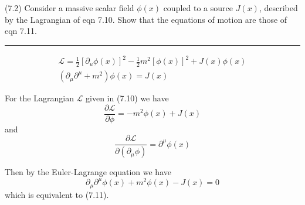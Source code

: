 \documentclass[12pt]{article}
\begin{document}
(7.2)
Consider a massive scalar field $\phi(x)$ coupled to
a source $J(x)$, described by the Lagrangian of
eqn 7.10. Show that the equations of motion are
those of eqn 7.11.

\bigskip
\hrule

\bigskip
\begin{gather*}
\mathcal L=\frac{1}{2}[\partial_u\phi(x)]^2-\frac{1}{2}m^2[\phi(x)]^2
+J(x)\phi(x)
\tag{7.10}
\\
(\partial_\mu\partial^\mu+m^2)\phi(x)=J(x)
\tag{7.11}
\end{gather*}

For the Lagrangian $\mathcal L$ given in (7.10) we have
\begin{equation*}
\frac{\partial\mathcal L}{\partial\phi}=-m^2\phi(x)+J(x)
\end{equation*}
and
\begin{equation*}
\frac{\partial\mathcal L}{\partial(\partial_\mu\phi)}
=\partial^\mu\phi(x)
\end{equation*}

Then by the Euler-Lagrange equation we have
\begin{equation*}
\partial_\mu\partial^\mu\phi(x)+m^2\phi(x)-J(x)=0
\end{equation*}
which is equivalent to (7.11).
\end{document}
